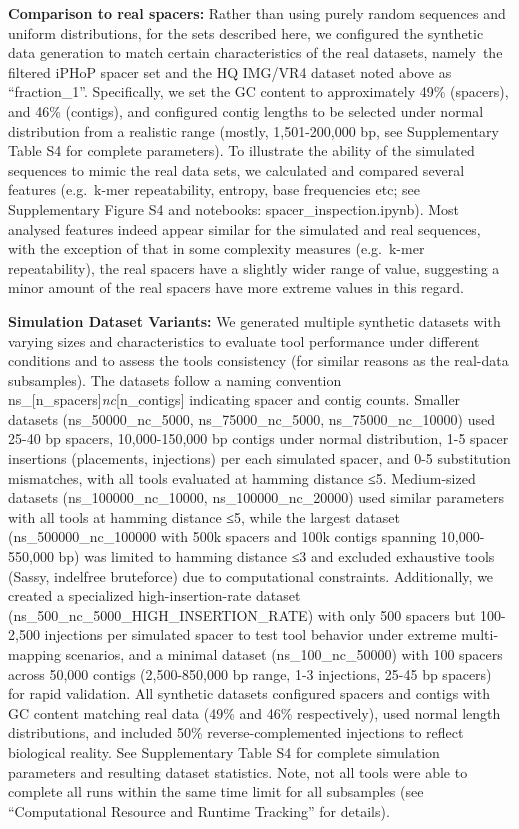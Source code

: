 \documentclass[
]{article}
\begin{document}
\textbf{Comparison to real spacers:} Rather than using purely random
sequences and uniform distributions, for the sets described here, we
configured the synthetic data generation to match certain
characteristics of the real datasets, namely~the filtered iPHoP spacer
set and the HQ IMG/VR4 dataset noted above as ``fraction\_1''.
Specifically, we set the GC content to approximately 49\% (spacers), and
46\% (contigs), and configured contig lengths to be selected under
normal distribution from a realistic range (mostly, 1,501-200,000 bp,
see Supplementary Table S4 for complete parameters). To illustrate the
ability of the simulated sequences to mimic the real data sets, we
calculated and compared several features (e.g.~k-mer repeatability,
entropy, base frequencies etc; see Supplementary Figure S4 and
notebooks: spacer\_inspection.ipynb). Most analysed features indeed
appear similar for the simulated and real sequences, with the exception
of that in some complexity measures (e.g.~k-mer repeatability), the real
spacers have a slightly wider range of value, suggesting a minor amount
of the real spacers have more extreme values in this regard.

\textbf{Simulation Dataset Variants:} We generated multiple synthetic
datasets with varying sizes and characteristics to evaluate tool
performance under different conditions and to assess the tools
consistency (for similar reasons as the real-data subsamples). The
datasets follow a naming convention
ns\_{[}n\_spacers{]}\emph{nc}{[}n\_contigs{]} indicating spacer and
contig counts. Smaller datasets (ns\_50000\_nc\_5000,
ns\_75000\_nc\_5000, ns\_75000\_nc\_10000) used 25-40 bp spacers,
10,000-150,000 bp contigs under normal distribution, 1-5 spacer
insertions (placements, injections) per each simulated spacer, and 0-5
substitution mismatches, with all tools evaluated at hamming distance
≤5. Medium-sized datasets (ns\_100000\_nc\_10000, ns\_100000\_nc\_20000)
used similar parameters with all tools at hamming distance ≤5, while the
largest dataset (ns\_500000\_nc\_100000 with 500k spacers and 100k
contigs spanning 10,000-550,000 bp) was limited to hamming distance ≤3
and excluded exhaustive tools (Sassy, indelfree bruteforce) due to
computational constraints. Additionally, we created a specialized
high-insertion-rate dataset (ns\_500\_nc\_5000\_HIGH\_INSERTION\_RATE)
with only 500 spacers but 100-2,500 injections per simulated spacer to
test tool behavior under extreme multi-mapping scenarios, and a minimal
dataset (ns\_100\_nc\_50000) with 100 spacers across 50,000 contigs
(2,500-850,000 bp range, 1-3 injections, 25-45 bp spacers) for rapid
validation. All synthetic datasets configured spacers and contigs with
GC content matching real data (49\% and 46\% respectively), used normal
length distributions, and included 50\% reverse-complemented injections
to reflect biological reality. See Supplementary Table S4 for complete
simulation parameters and resulting dataset statistics. Note, not all
tools were able to complete all runs within the same time limit for all
subsamples (see ``Computational Resource and Runtime Tracking'' for
details).
\end{document}

